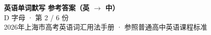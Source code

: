 \documentclass[10pt,a4paper]{article}
\begin{document}
\pagestyle{plain}

\begin{center}
{\LARGE\bfseries 英语单词默写 \quad 参考答案（英 $\to$ 中）}\\[0.22em]
{\large D 字母 · 第 2 / 6 份}\\[0.18em]
{\small 2026年上海市高考英语词汇用法手册 · 参照普通高中英语课程标准}
\end{center}

\vspace{0.2em}
\noindent{\color{rulegray}\rule{\textwidth}{0.8pt}}

\vspace{0.35em}

\vspace{0.25em}
\renewcommand{\arraystretch}{1.32}
\end{document}
